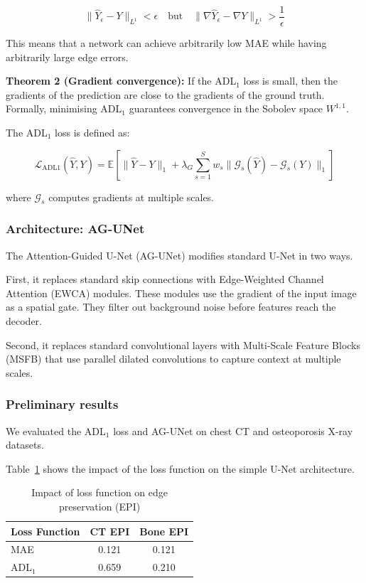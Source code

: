 \[
\|\hat{Y}_\epsilon - Y\|_{L^1} < \epsilon \quad \text{but} \quad \|\nabla \hat{Y}_\epsilon - \nabla Y\|_{L^1} > \frac{1}{\epsilon}
\]

This means that a network can achieve arbitrarily low MAE while having arbitrarily large edge errors.

\textbf{Theorem 2 (Gradient convergence):} If the ADL\(_1\) loss is small, then the gradients of the prediction are close to the gradients of the ground truth. Formally, minimising ADL\(_1\) guarantees convergence in the Sobolev space \(W^{1,1}\).

The ADL\(_1\) loss is defined as:

\[
\mathcal{L}_{\text{ADL1}}(\hat{Y},Y) = \mathbb{E}\left[\|\hat{Y} - Y\|_1 + \lambda_G \sum_{s=1}^{S} w_s \| \mathcal{G}_s(\hat{Y}) - \mathcal{G}_s(Y) \|_1\right]
\]

where \(\mathcal{G}_s\) computes gradients at multiple scales.

\subsubsection{Architecture: AG-UNet}

The Attention-Guided U-Net (AG-UNet) modifies standard U-Net in two ways.

First, it replaces standard skip connections with Edge-Weighted Channel Attention (EWCA) modules. These modules use the gradient of the input image as a spatial gate. They filter out background noise before features reach the decoder.

Second, it replaces standard convolutional layers with Multi-Scale Feature Blocks (MSFB) that use parallel dilated convolutions to capture context at multiple scales.

\subsubsection{Preliminary results}

We evaluated the ADL\(_1\) loss and AG-UNet on chest CT and osteoporosis X-ray datasets.

Table~\ref{tab:adl1} shows the impact of the loss function on the simple U-Net architecture.

\begin{table}[H]
	\centering
	\caption{Impact of loss function on edge preservation (EPI)}
	\label{tab:adl1}
	\begin{tabular}{lcc}
		\toprule
		Loss Function & CT EPI & Bone EPI \\
		\midrule
		MAE & 0.121 & 0.121 \\
		ADL\(_1\) & 0.659 & 0.210 \\
		\bottomrule
	\end{tabular}
\end{table}

